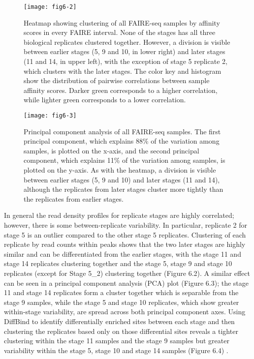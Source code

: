 \begin{figure}
\centering
\texttt{[image: fig6-2]}
\caption[Clustering of all FAIRE-seq samples by affinity scores in every FAIRE interval]{Heatmap showing clustering of all FAIRE-seq samples by affinity scores in every FAIRE interval. None of the stages has all three biological replicates clustered together. However, a division is visible between earlier stages (5, 9 and 10, in lower right) and later stages (11 and 14, in upper left), with the exception of stage 5 replicate 2, which clusters with the later stages. The color key and histogram show the distribution of pairwise correlations between sample affinity scores. Darker green corresponds to a higher correlation, while lighter green corresponds to a lower correlation.}
\label{Figure 6.2}
\end{figure}

\begin{figure}
\centering
\texttt{[image: fig6-3]}
\caption[Principal component analysis of all FAIRE-seq samples]{Principal component analysis of all FAIRE-seq samples. The first principal component, which explains 88\% of the variation among samples, is plotted on the x-axis, and the second principal component, which explains 11\% of the variation among samples, is plotted on the y-axis. As with the heatmap, a division is visible between earlier stages (5, 9 and 10) and later stages (11 and 14), although the replicates from later stages cluster more tightly than the replicates from earlier stages.}
\label{Figure 6.3}
\end{figure}

In general the read density profiles for replicate stages are highly correlated; however, there is some between-replicate variability. In particular, replicate 2 for stage 5 is an outlier compared to the other stage 5 replicates. Clustering of each replicate by read counts within peaks shows that the two later stages are highly similar and can be differentiated from the earlier stages, with the stage 11 and stage 14 replicates clustering together and the stage 5, stage 9 and stage 10 replicates (except for Stage 5\_2) clustering together (Figure 6.2). A similar effect can be seen in a principal component analysis (PCA) plot (Figure 6.3); the stage 11 and stage 14 replicates form a cluster together which is separable from the stage 9 samples, while the stage 5 and stage 10 replicates, which show greater within-stage variability, are spread across both principal component axes. Using DiffBind to identify differentially enriched sites between each stage and then clustering the replicates based only on those differential sites reveals a tighter clustering within the stage 11 samples and the stage 9 samples but greater variability within the stage 5, stage 10 and stage 14 samples (Figure 6.4) \citep{ross-innes_differential_2012}.\\

